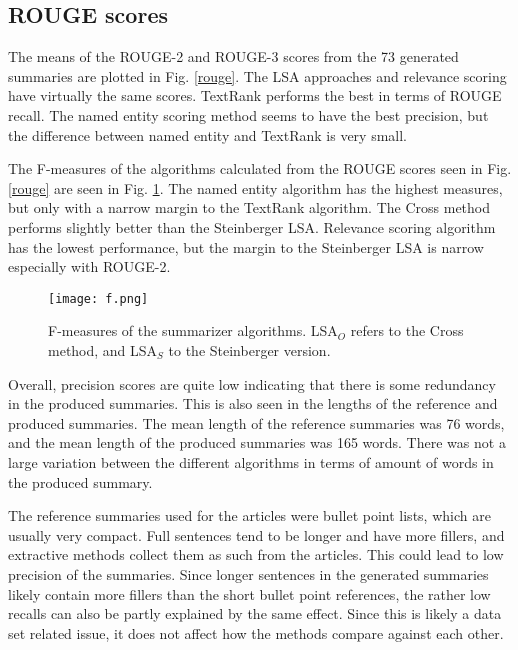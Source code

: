 \documentclass[conference]{IEEEtran}
\begin{document}
\subsection{ROUGE scores}
\begin{figure*}[!t]
	\centering
	\hfill
	\caption{The ROUGE-2 and ROUGE-3 scores of the implemented summarizers. LSA$_O$ refers to the Cross method, and LSA$_S$ to the Steinberger version.}
	\label{rouge} 
\end{figure*}
The means of the ROUGE-2 and ROUGE-3 scores from the 73 generated summaries are plotted in Fig. \ref{rouge}. 
The LSA approaches and relevance scoring have virtually the same scores. TextRank performs the best in terms of ROUGE recall. The named entity scoring method seems to have the best precision, but the difference between named entity and TextRank is very small.

The F-measures of the algorithms calculated from the ROUGE scores seen in Fig. \ref{rouge} are seen in Fig. \ref{f}. The named entity algorithm has the highest measures, but only with a narrow margin to the TextRank algorithm. The Cross method performs slightly better than the Steinberger LSA. Relevance scoring algorithm has the lowest performance, but the margin to the Steinberger LSA is narrow especially with ROUGE-2.
\begin{figure}[!b]
	\centerline{\texttt{[image: f.png]}}
	\caption{F-measures of the summarizer algorithms. LSA$_O$ refers to the Cross method, and LSA$_S$ to the Steinberger version.}
	\label{f}
\end{figure}

Overall, precision scores are quite low indicating that there is some redundancy in the produced summaries. This is also seen in the lengths of the reference and produced summaries. The mean length of the reference summaries was 76 words, and the mean length of the produced summaries was 165 words. 
There was not a large variation between the different algorithms in terms of amount of words in the produced summary. 

The reference summaries used for the articles were bullet point lists, which are usually very compact. Full sentences tend to be longer and have more fillers, and extractive methods collect them as such from the articles. This could lead to low precision of the summaries. 
Since longer sentences in the generated summaries likely contain more fillers than the short bullet point references, the rather low recalls can also be partly explained by the same effect. Since this is likely a data set related issue, it does not affect how the methods compare against each other.
\end{document}
